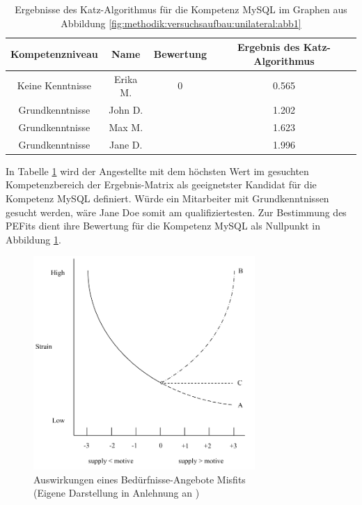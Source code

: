 \begin{table}[h]
	\centering
	\begin{tabular}{c|c|c|c}
		Kompetenzniveau & Name & Bewertung & Ergebnis des Katz-Algorithmus \\
		\hline
		\rowcolor{exxetagray} Keine Kenntnisse & Erika M.  & 0                  & 0.565\\
		\hline
		\rowcolor{itemcolor} Grundkenntnisse  & John D.   & \kantengewicht     & 1.202\\
		\rowcolor{itemcolor} Grundkenntnisse  & Max M.    & \kantengewicht     & 1.623\\
		\rowcolor{itemcolor} Grundkenntnisse  & Jane D.   & \kantengewicht     & 1.996
	\end{tabular}
	\caption{Ergebnisse des Katz-Algorithmus für die Kompetenz MySQL im Graphen aus Abbildung \ref{fig:methodik:versuchsaufbau:unilateral:abb1}}
	\label{tbl:methodik:versuchsaufbau:unilateral:tbl1}
\end{table}

In Tabelle \ref{tbl:methodik:versuchsaufbau:unilateral:tbl1} wird der Angestellte mit dem höchsten Wert im gesuchten Kompetenzbereich der Ergebnis-Matrix als geeignetster Kandidat für die Kompetenz MySQL definiert. Würde ein Mitarbeiter mit Grundkenntnissen gesucht werden, wäre Jane Doe somit am qualifiziertesten. Zur Bestimmung des \acp{PEFit} dient ihre Bewertung für die Kompetenz MySQL als Nullpunkt in Abbildung \ref{fig:methodik:versuchsaufbau:unilateral:abb2}.

\begin{figure}[h]
	\centering
	\includegraphics[width=0.75\textwidth]{gfx/ueberschuss_supply_motive.png}
	\caption{Auswirkungen eines Bedürfnisse-Angebote Misfits\\(Eigene Darstellung in Anlehnung an \cite[S. 23]{edwards:2008})}
	\label{fig:methodik:versuchsaufbau:unilateral:abb2}
\end{figure}

